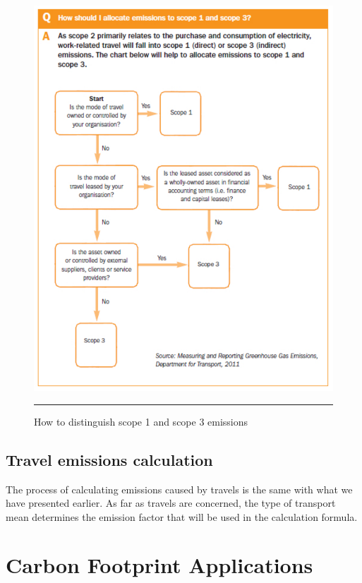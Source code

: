\begin{figure}[htbp]
	\centering
		\includegraphics[scale=0.85]{./Figures/chapter2/figure17.pdf}
		\rule{35em}{0.5pt}
	\caption[Seperating Scope 1 and Scope 3 Emissions]{How to distinguish scope 1 and scope 3 emissions\cite{reference24}}
	\label{fig:scope1Scope3}
\end{figure}


\subsection{Travel emissions calculation}

The process of calculating emissions caused by travels is the same with what we have presented earlier. As far as travels are concerned, the type of transport mean determines the emission factor that will be used in the calculation formula.

\section{Carbon Footprint Applications}

